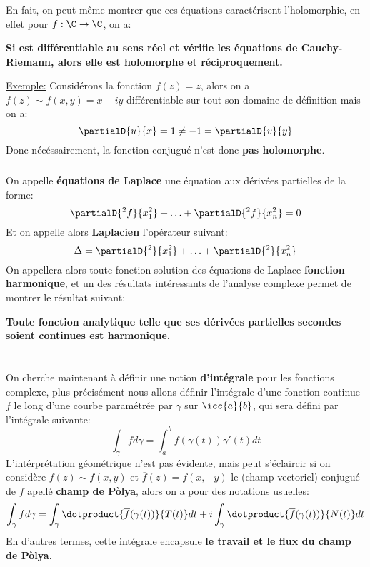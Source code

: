 \subsection*{}
En fait, on peut même montrer que ces équations caractérisent l'holomorphie, en effet pour \(f : \C \rightarrow \C\), on a:
\begin{center}
   \textbf{Si est différentiable \textbf{au sens réel} et vérifie les équations de Cauchy-Riemann, alors elle est holomorphe et réciproquement.}
\end{center}
\uline{Exemple:} Considérons la fonction \(f(z) = \overline{z}\), alors on a \(f(z) \sim f(x, y) = x - iy\) différentiable sur tout son domaine de définition mais on a:
\[
   \partialD{u}{x} = 1 \neq -1 = \partialD{v}{y} 
\]
Donc nécéssairement, la fonction conjugué n'est donc \textbf{pas holomorphe}.
\subsection*{}
On appelle \textbf{équations de Laplace} une équation aux dérivées partielles de la forme:
\[
   \partialD{{}^2f}{x_1^2} + \ldots + \partialD{{}^2f}{x_n^2} = 0
\]
Et on appelle alors \textbf{Laplacien} l'opérateur suivant:
\[
   \Delta = \partialD{{}^2}{x_1^2} + \ldots + \partialD{{}^2}{x_n^2}
\]
On appellera alors toute fonction solution des équations de Laplace \textbf{fonction harmonique}, et un des résultats intéressants de l'analyse complexe permet de montrer le résultat suivant:
\begin{center}
   \textbf{Toute fonction analytique telle que ses dérivées partielles secondes soient continues est harmonique.}
\end{center}
\chapter*{} %
On cherche maintenant à définir une notion \textbf{d'intégrale} pour les fonctions complexe, plus précisément nous allons définir l'intégrale d'une fonction continue \(f\) le long d'une courbe paramétrée par \(\gamma\) sur \(\icc{a}{b}\), qui sera défini par l'intégrale suivante:
\[
   \int_{\gamma} f d\gamma = \int_{a}^{b} f(\gamma(t))\gamma'(t) d t
\]
L'intérprétation géométrique n'est pas évidente, mais peut s'éclaircir si on considère \(f(z) \sim f(x, y)\) et \(\overline{f}(z) = f(x, -y)\) le (champ vectoriel) conjugué de \(f\) apellé \textbf{champ de Pòlya}, alors on a pour des notations usuelles:
\[
   \int_{\gamma} f d\gamma = \int_{\gamma} \dotproduct{\overline{f}(\gamma(t))}{T(t)} d t + i \int_{\gamma} \dotproduct{\overline{f}(\gamma(t))}{N(t)}  d t
\]
En d'autres termes, cette intégrale encapsule \textbf{le travail et le flux du champ de Pòlya}.

